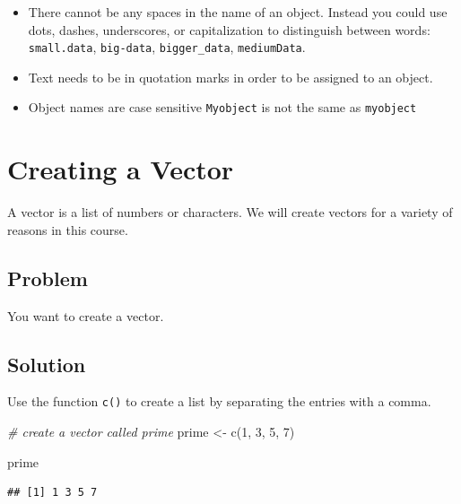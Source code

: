 \documentclass[
]{book}
\newenvironment{Shaded}{\begin{snugshade}}{\end{snugshade}}
\newcommand{\CommentTok}[1]{\textcolor[rgb]{0.56,0.35,0.01}{\textit{#1}}}
\newcommand{\DecValTok}[1]{\textcolor[rgb]{0.00,0.00,0.81}{#1}}
\newcommand{\FunctionTok}[1]{\textcolor[rgb]{0.00,0.00,0.00}{#1}}
\newcommand{\NormalTok}[1]{#1}
\newcommand{\OtherTok}[1]{\textcolor[rgb]{0.56,0.35,0.01}{#1}}
\providecommand{\tightlist}{%
  \setlength{\itemsep}{0pt}\setlength{\parskip}{0pt}}
\begin{document}
\begin{itemize}
\tightlist
\item
  There cannot be any spaces in the name of an object. Instead you could use dots, dashes, underscores, or capitalization to distinguish between words: \texttt{small.data}, \texttt{big-data}, \texttt{bigger\_data}, \texttt{mediumData}.
\item
  Text needs to be in quotation marks in order to be assigned to an object.
\item
  Object names are case sensitive \texttt{Myobject} is not the same as \texttt{myobject}
\end{itemize}

\hypertarget{vector}{%
\section{Creating a Vector}\label{vector}}

A vector is a list of numbers or characters. We will create vectors for a variety of reasons in this course.

\hypertarget{problem-2}{%
\subsection{Problem}\label{problem-2}}

You want to create a vector.

\hypertarget{solution-2}{%
\subsection{Solution}\label{solution-2}}

Use the function \texttt{c()} to create a list by separating the entries with a comma.

\begin{Shaded}
\begin{Highlighting}[]
\CommentTok{\# create a vector called \textquotesingle{}prime\textquotesingle{}}
\NormalTok{prime }\OtherTok{\textless{}{-}} \FunctionTok{c}\NormalTok{(}\DecValTok{1}\NormalTok{, }\DecValTok{3}\NormalTok{, }\DecValTok{5}\NormalTok{, }\DecValTok{7}\NormalTok{)}

\NormalTok{prime}
\end{Highlighting}
\end{Shaded}

\begin{verbatim}
## [1] 1 3 5 7
\end{verbatim}
\end{document}
